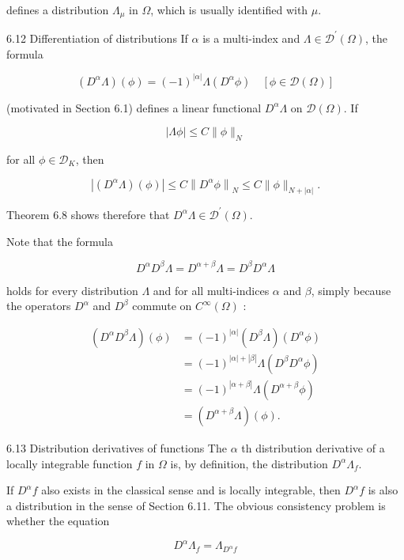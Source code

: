 \documentclass[10pt]{article}
\begin{document}
defines a distribution $\Lambda_{\mu}$ in $\Omega$, which is usually identified with $\mu$.

6.12 Differentiation of distributions If $\alpha$ is a multi-index and $\Lambda \in \mathscr{D}^{\prime}(\Omega)$, the formula

$$
\left(D^{\alpha} \Lambda\right)(\phi)=(-1)^{|\alpha|} \Lambda\left(D^{\alpha} \phi\right) \quad[\phi \in \mathscr{D}(\Omega)]
$$

(motivated in Section 6.1) defines a linear functional $D^{\alpha} \Lambda$ on $\mathscr{D}(\Omega)$. If

$$
|\Lambda \phi| \leq C\|\phi\|_{N}
$$

for all $\phi \in \mathscr{D}_{K}$, then

$$
\left|\left(D^{\alpha} \Lambda\right)(\phi)\right| \leq C\left\|D^{\alpha} \phi\right\|_{N} \leq C\|\phi\|_{N+|\alpha|} .
$$

Theorem 6.8 shows therefore that $D^{\alpha} \Lambda \in \mathscr{D}^{\prime}(\Omega)$.

Note that the formula

$$
D^{\alpha} D^{\beta} \Lambda=D^{\alpha+\beta} \Lambda=D^{\beta} D^{\alpha} \Lambda
$$

holds for every distribution $\Lambda$ and for all multi-indices $\alpha$ and $\beta$, simply because the operators $D^{\alpha}$ and $D^{\beta}$ commute on $C^{\infty}(\Omega)$ :

$$
\begin{aligned}
\left(D^{\alpha} D^{\beta} \Lambda\right)(\phi) & =(-1)^{|\alpha|}\left(D^{\beta} \Lambda\right)\left(D^{\alpha} \phi\right) \\
& =(-1)^{|\alpha|+|\beta|} \Lambda\left(D^{\beta} D^{\alpha} \phi\right) \\
& =(-1)^{|\alpha+\beta|} \Lambda\left(D^{\alpha+\beta} \phi\right) \\
& =\left(D^{\alpha+\beta} \Lambda\right)(\phi) .
\end{aligned}
$$

6.13 Distribution derivatives of functions The $\alpha$ th distribution derivative of a locally integrable function $f$ in $\Omega$ is, by definition, the distribution $D^{\alpha} \Lambda_{f}$.

If $D^{\alpha} f$ also exists in the classical sense and is locally integrable, then $D^{\alpha} f$ is also a distribution in the sense of Section 6.11. The obvious consistency problem is whether the equation

$$
D^{\alpha} \Lambda_{f}=\Lambda_{D^{\alpha} f}
$$
\end{document}
